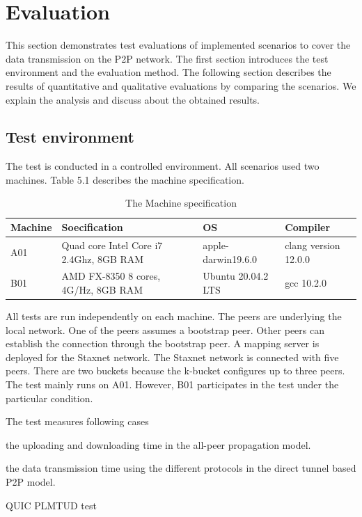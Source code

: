 \chapter{Evaluation}
\label{cha:evaluation}

This section demonstrates test evaluations of implemented scenarios to cover the data transmission on the P2P network. The first section introduces the test environment and the evaluation method. The following section describes the results of quantitative and qualitative evaluations by comparing the scenarios. We explain the analysis and discuss about the obtained results.

\section{Test environment}

The test is conducted in a controlled environment. All scenarios used two machines. Table 5.1 describes the machine specification. 

\begin{table}[!ht]
	\small
	\centering
	\begin{tabular}{|l|l|l|l|}
		\hline
		Machine & Soecification & OS & Compiler \\
		\hline
		A01 & Quad core Intel Core i7 2.4Ghz, 8GB RAM & apple-darwin19.6.0 & clang version 12.0.0\\
		\hline
		B01 & AMD FX-8350 8 cores, 4G/Hz, 8GB RAM & Ubuntu 20.04.2 LTS & gcc 10.2.0 \\
		\hline
	\end{tabular}
	\caption{The Machine specification}
\end{table}

All tests are run independently on each machine. The peers are underlying the local network. One of the peers assumes a bootstrap peer. Other peers can establish the connection through the bootstrap peer. A mapping server is deployed for the Staxnet network. The Staxnet network is connected with five peers. There are two buckets because the k-bucket configures up to three peers. The test mainly runs on A01. However, B01 participates in the test under the particular condition.

The test measures following cases

\begin{description}
	\item the uploading and downloading time in the all-peer propagation model. 
	\item the data transmission time using the different protocols in the direct tunnel based P2P model.
	\item QUIC PLMTUD test
\end{description}


